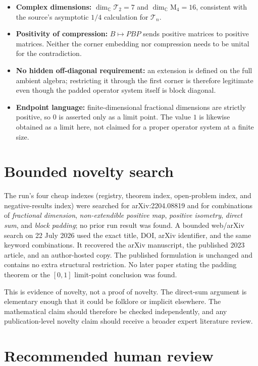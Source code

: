 \documentclass[11pt]{article}
\theoremstyle{remark}
\newcommand{\C}{\mathbb C}
\newcommand{\M}{\mathrm M}
\begin{document}
\begin{itemize}
  \item \textbf{Complex dimensions:} $\dim_{\C}\mathcal T_2=7$ and $\dim_{\C}\M_4=16$, consistent with the source's asymptotic $1/4$ calculation for $\mathcal T_n$.
  \item \textbf{Positivity of compression:} $B\mapsto PBP$ sends positive matrices to positive matrices.  Neither the corner embedding nor compression needs to be unital for the contradiction.
  \item \textbf{No hidden off-diagonal requirement:} an extension is defined on the full ambient algebra; restricting it through the first corner is therefore legitimate even though the padded operator system itself is block diagonal.
  \item \textbf{Endpoint language:} finite-dimensional fractional dimensions are strictly positive, so $0$ is asserted only as a limit point.  The value $1$ is likewise obtained as a limit here, not claimed for a proper operator system at a finite size.
\end{itemize}

\section{Bounded novelty search}

The run's four cheap indexes (registry, theorem index, open-problem index, and negative-results index) were searched for arXiv:2204.08819 and for combinations of \emph{fractional dimension}, \emph{non-extendible positive map}, \emph{positive isometry}, \emph{direct sum}, and \emph{block padding}; no prior run result was found.  A bounded web/arXiv search on 22 July 2026 used the exact title, DOI, arXiv identifier, and the same keyword combinations.  It recovered the arXiv manuscript, the published 2023 article, and an author-hosted copy.  The published formulation is unchanged and contains no extra structural restriction.  No later paper stating the padding theorem or the $[0,1]$ limit-point conclusion was found.

This is evidence of novelty, not a proof of novelty.  The direct-sum argument is elementary enough that it could be folklore or implicit elsewhere.  The mathematical claim should therefore be checked independently, and any publication-level novelty claim should receive a broader expert literature review.

\section{Recommended human review}
\end{document}
